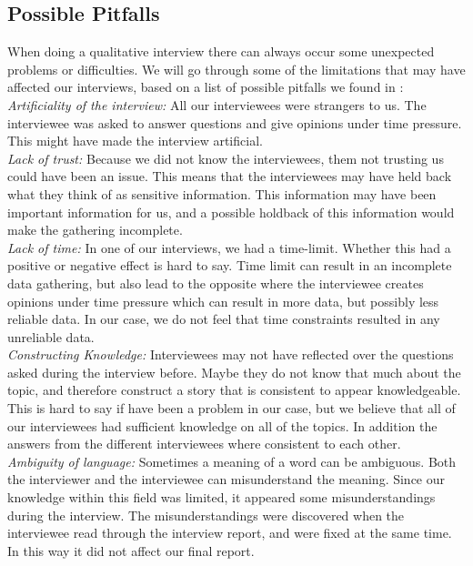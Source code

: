 \subsection{Possible Pitfalls}
When doing a qualitative interview there can always occur some unexpected problems or difficulties. We will go through some of the limitations that may have affected our interviews, based on a list of possible pitfalls we found in \cite{interview}:\\
\emph{Artificiality of the interview:} All our interviewees were strangers to us. The interviewee was asked to answer questions  and give opinions under time pressure. This might have made the interview artificial. \\
\emph{Lack of trust:} Because we did not know the interviewees, them not trusting us could have been an issue. This means that the interviewees may have held back what they think of as sensitive information. This information may have been important information for us, and a possible holdback of this information would make the gathering incomplete. \\
\emph{Lack of time:} In one of our interviews, we had a time-limit. Whether this had a positive or negative effect is hard to say. Time limit can result in an incomplete data gathering, but also lead to the opposite where the interviewee creates opinions under time pressure which can result in more data, but possibly less reliable data. In our case, we do not feel that time constraints resulted in any unreliable data. \\
\emph{Constructing Knowledge:} Interviewees may not have reflected over the questions asked during the interview before. Maybe they do not know that much about the topic, and therefore construct a story that is consistent to appear knowledgeable. This is hard to say if have been a problem in our case, but we believe that all of our interviewees had sufficient knowledge on all of the topics. In addition the answers from the different interviewees where consistent to each other. \\
\emph{Ambiguity of language:} Sometimes a meaning of a word can be ambiguous. Both the interviewer and the interviewee can misunderstand the meaning. Since our knowledge within this field was limited, it appeared some misunderstandings during the interview. The misunderstandings were discovered when the interviewee read through the interview report, and were fixed at the same time. In this way it did not affect our final report.  

